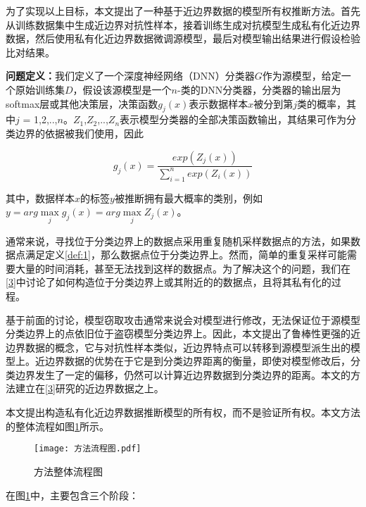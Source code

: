 为了实现以上目标，本文提出了一种基于近边界数据的模型所有权推断方法。首先从训练数据集中生成近边界对抗性样本，接着训练生成对抗模型生成私有化近边界数据，然后使用私有化近边界数据微调源模型，最后对模型输出结果进行假设检验比对结果。

\noindent\textbf{问题定义：}我们定义了一个深度神经网络（DNN）分类器$G$作为源模型，给定一个原始训练集$D$，假设该源模型是一个$n$-类的DNN分类器，分类器的输出层为softmax层或其他决策层，决策函数$g_j(x)$表示数据样本$x$被分到第$j$类的概率，其中$j$ = 1,2,..,$n$。$Z_1$,$Z_2$,..,$Z_n$表示模型分类器的全部决策函数输出，其结果可作为分类边界的依据被我们使用，因此

\begin{equation}
	g_j(x) = \frac{exp(Z_j(x))}{\sum_{i = 1}^n exp(Z_i(x))}
\end{equation}

\noindent 其中，数据样本$x$的标签$y$被推断拥有最大概率的类别，例如$y = arg \mathop{max} \limits_j g_j(x) = arg \mathop{max} \limits_j Z_j(x)$。

通常来说，寻找位于分类边界上的数据点采用重复随机采样数据点的方法，如果数据点满足定义\ref{def:1}，那么数据点位于分类边界上。然而，简单的重复采样可能需要大量的时间消耗，甚至无法找到这样的数据点。为了解决这个的问题，我们在\ref{3}中讨论了如何构造位于分类边界上或其附近的的数据点，且将其私有化的过程。

基于前面的讨论，模型窃取攻击通常来说会对模型进行修改，无法保证位于源模型分类边界上的点依旧位于盗窃模型分类边界上。因此，本文提出了鲁棒性更强的近边界数据的概念，它与对抗性样本类似，近边界特点可以转移到源模型派生出的模型上。近边界数据的优势在于它是到分类边界距离的衡量，即使对模型修改后，分类边界发生了一定的偏移，仍然可以计算近边界数据到分类边界的距离。本文的方法建立在\ref{3}研究的近边界数据之上。

本文提出构造私有化近边界数据推断模型的所有权，而不是验证所有权。本文方法的整体流程如图\ref{方法流程图}所示。

\begin{figure}[htbp]%
	\centering
	\texttt{[image: 方法流程图.pdf]}
	\setlength{\abovecaptionskip}{5mm} %
	\caption{方法整体流程图}
	\label{方法流程图}
	\end {figure}
	
在图\ref{方法流程图}中，主要包含三个阶段：

